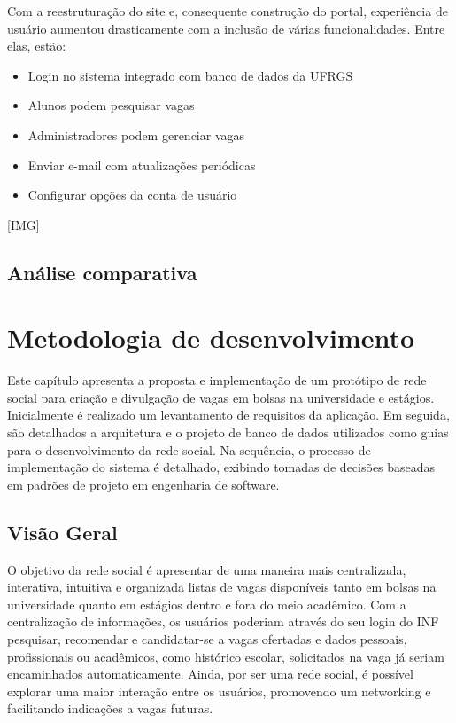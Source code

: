 \documentclass[cic,tc]{iiufrgs}
\begin{document}
Com a reestruturação do site e, consequente construção do portal, experiência de usuário aumentou drasticamente  com a inclusão de várias funcionalidades. Entre elas, estão:
\begin{itemize}
    \item Login no sistema integrado com banco de dados da UFRGS
    \item Alunos podem pesquisar vagas
    \item Administradores podem gerenciar vagas
    \item Enviar e-mail com atualizações periódicas
    \item Configurar opções da conta de usuário
\end{itemize}

[IMG]

\section{Análise comparativa}
\label{trabRelAnalise}

\chapter{Metodologia de desenvolvimento}
\label{metodologiaDesenvolvimento}
Este capítulo apresenta a proposta e implementação de um protótipo de rede social para criação e divulgação de vagas em bolsas na universidade e estágios. Inicialmente é realizado um levantamento de requisitos da aplicação. Em seguida, são detalhados a arquitetura e o projeto de banco de dados utilizados como guias para o desenvolvimento da rede social. Na sequência, o processo de implementação do sistema é detalhado, exibindo tomadas de decisões baseadas em padrões de projeto em engenharia de software.

\section{Visão Geral}
\label{metodologiaVisaoGeral}
O objetivo da rede social é apresentar de uma maneira mais centralizada, interativa, intuitiva e organizada listas de vagas disponíveis tanto em bolsas na universidade quanto em estágios dentro e fora do meio acadêmico. Com a centralização de informações, os usuários poderiam através do seu login do INF pesquisar, recomendar e candidatar-se a vagas ofertadas e dados pessoais, profissionais ou acadêmicos, como histórico escolar, solicitados na vaga já seriam encaminhados automaticamente. Ainda, por ser uma rede social, é possível explorar uma maior interação entre os usuários, promovendo um networking e facilitando indicações a vagas futuras.
\end{document}
